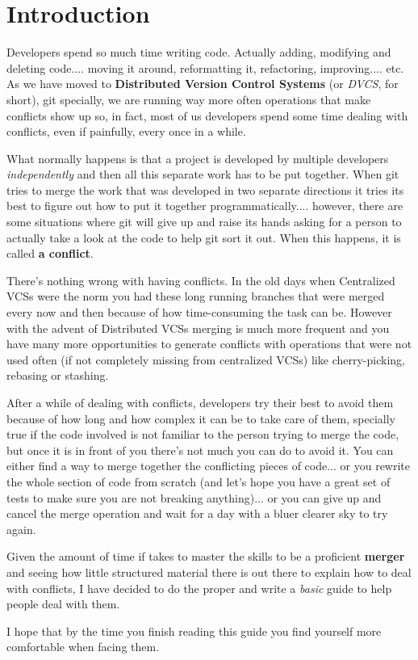 
\section{Introduction}

Developers spend so much time writing code. Actually adding, modifying and deleting code.... moving it around, reformatting it,
refactoring, improving.... etc. As we have moved to {\bf Distributed Version Control Systems} (or {\it DVCS}, for short), git
specially, we are running way more often operations that make conflicts show up so, in fact, most of us developers spend some
time dealing with conflicts, even if painfully, every once in a while.

What normally happens is that a project is developed by multiple developers {\it independently} and then all this separate work
has to be put together. When git tries to merge the work that was developed in two separate directions it tries its best to figure
out how to put it together programmatically.... however, there are some situations where git will give up and raise its hands asking
for a person to actually take a look at the code to help git sort it out. When this happens, it is called {\bf a conflict}.

There's nothing wrong with having conflicts. In the old days when Centralized VCSs were the norm you had these long running branches
that were merged every now and then because of how time-consuming the task can be. However with the advent of Distributed VCSs
merging is much more frequent and you have many more opportunities to generate conflicts with operations that were not used often
(if not completely missing from centralized VCSs) like cherry-picking, rebasing or stashing.

After a while of dealing with conflicts, developers try their best to avoid them because of how long and how complex it can be to
take care of them, specially true if the code involved is not familiar to the person trying to merge the code, but once it is in
front of you there's not much you can do to avoid it. You can either find a way to merge together the conflicting pieces of code...
or you rewrite the whole section of code from scratch (and let's hope you have a great set of tests to make sure you are not breaking
anything)... or you can give up and cancel the merge operation and wait for a day with a bluer clearer sky to try again.

Given the amount of time if takes to master the skills to be a proficient {\bf merger} and seeing how little structured material there
is out there to explain how to deal with conflicts, I have decided to do the proper and write a {\it basic} guide to help people deal
with them.

I hope that by the time you finish reading this guide you find yourself more comfortable when facing them.

